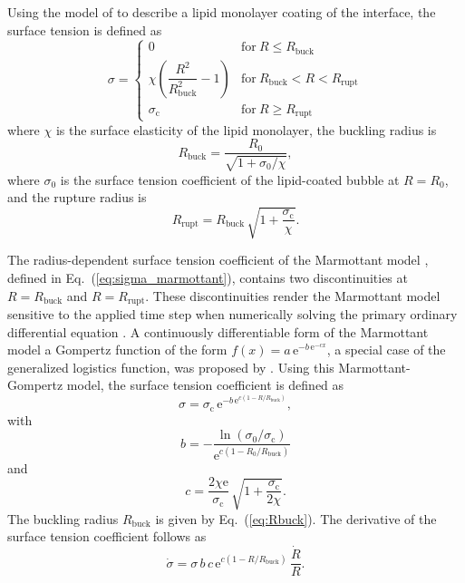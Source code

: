 Using the model of \citet{Marmottant2005} to describe a lipid monolayer coating of the interface, the surface tension is defined as
\begin{equation}
\sigma =
\begin{cases}
0 & \text{for} \ R \leq R_\text{buck} \\
\chi \left(\dfrac{R^2}{R_\text{buck}^2} - 1 \right) & \text{for} \ R_\text{buck} < R < R_\text{rupt} \\
\sigma_\text{c} & \text{for} \ R \geq R_\text{rupt}
\end{cases} \label{eq:sigma_marmottant}
\end{equation}
where $\chi$ is the surface elasticity of the lipid monolayer, the buckling radius is \citep{Overvelde2010}
\begin{equation}
R_\text{buck} = \frac{R_0}{\sqrt{1 + \sigma_0/\chi}}, 
\label{eq:Rbuck}
\end{equation}
where $\sigma_0$ is the surface tension coefficient of the lipid-coated bubble at $R=R_0$, and the rupture radius is
\begin{equation}
R_\text{rupt} = R_\text{buck} \, \sqrt{1+\frac{\sigma_\text{c}}{\chi}}.
\label{eq:Rrupt}
\end{equation} 

The radius-dependent surface tension coefficient of the Marmottant model \citep{Marmottant2005}, defined in Eq.~(\ref{eq:sigma_marmottant}), contains two discontinuities at $R=R_\text{buck}$ and $R=R_\text{rupt}$. These discontinuities render the Marmottant model sensitive to the applied time step when numerically solving the primary ordinary differential equation \citep{Versluis2020}. A continuously differentiable form of the Marmottant model a Gompertz function of the form $f(x) = a \, \text{e}^{-b \, \text{e}^{-c x}}$, a special case of the generalized logistics function, was proposed by \citet{Guemmer2021}. Using this Marmottant-Gompertz model, the surface tension coefficient is defined as
\begin{equation}
\sigma = \sigma_\text{c} \, \text{e}^{-b \, \text{e}^{c (1-R/R_\text{buck})}}, \label{eq:sigma_gompertz}
\end{equation}
with
\begin{equation}
    b = - \frac{\ln (\sigma_0/\sigma_\text{c})}{\text{e}^{c(1-R_0/R_\text{buck})}}
\end{equation}
and
\begin{equation}
    c = \frac{2  \chi  \text{e}}{\sigma_\text{c}} \, \sqrt{1+\frac{\sigma_\text{c}}{2 \chi}}.
\end{equation}
The buckling radius $R_\text{buck}$ is given by Eq.~(\ref{eq:Rbuck}). 
The derivative of the surface tension coefficient follows as
\begin{equation}
\dot{\sigma} = \sigma \, b \, c \, \text{e}^{c (1-R/R_\text{buck})} \, \frac{\dot{R}}{R}.
\end{equation}


